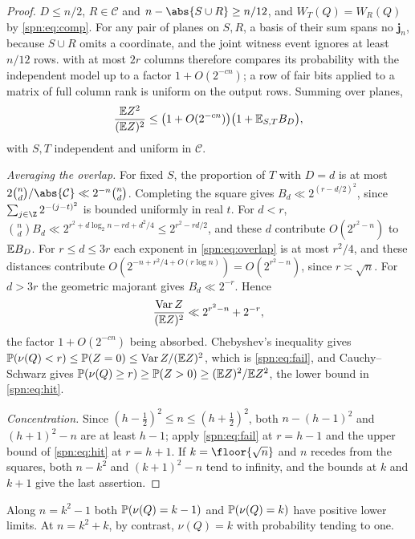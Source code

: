\begin{proof}
$D\le n/2$, $R\in\mathcal C$ and $n-\abs{S\cup R}\ge n/12$, and $W_T(Q)=W_R(Q)$ by
\eqref{spn:eq:comp}. For any pair of planes on $S,R$, a basis of their sum spans no
$\mathbf j_n$, because $S\cup R$ omits a coordinate, and the joint witness event ignores at
least $n/12$ rows.  with at most $2r$ columns therefore compares its
probability with the independent model up to a factor $1+O(2^{-cn})$; a row of fair bits
applied to a matrix of full column rank is uniform on the output rows. Summing over planes,
\[
 \frac{\mathbb{E} Z^2}{(\mathbb{E} Z)^2}\le\bigl(1+O(2^{-cn})\bigr)\bigl(1+\mathbb{E}_{S,T}B_D\bigr),
\]
with $S,T$ independent and uniform in $\mathcal C$.

\emph{Averaging the overlap.} For fixed $S$, the proportion of $T$ with $D=d$ is at most
$2\binom nd/\abs{\mathcal C}\ll2^{-n}\binom nd$. Completing the square gives
$B_d\ll2^{(r-d/2)^2}$, since $\sum_{j\in\Z}2^{-(j-t)^2}$ is bounded uniformly in real $t$.
For $d<r$, $\binom ndB_d\ll2^{r^2+d\log_2n-rd+d^2/4}\le2^{r^2-rd/2}$, and these $d$ contribute
$O(2^{r^2-n})$ to $\mathbb{E} B_D$. For $r\le d\le3r$ each exponent in \eqref{spn:eq:overlap} is at
most $r^2/4$, and these distances contribute $O(2^{-n+r^2/4+O(r\log n)})=O(2^{r^2-n})$, since
$r\asymp\sqrt n$. For $d>3r$ the geometric majorant gives $B_d\ll2^{-r}$. Hence
\begin{equation}\label{spn:eq:variance}
 \frac{\operatorname{Var}Z}{(\mathbb{E} Z)^2}\ll2^{r^2-n}+2^{-r},
\end{equation}
the factor $1+O(2^{-cn})$ being absorbed. Chebyshev's inequality gives
$\mathbb{P}(\nu(Q)<r)\le\mathbb{P}(Z=0)\le\operatorname{Var}Z/(\mathbb{E} Z)^2$, which is \eqref{spn:eq:fail},
and Cauchy--Schwarz gives $\mathbb{P}(\nu(Q)\ge r)\ge\mathbb{P}(Z>0)\ge(\mathbb{E} Z)^2/\mathbb{E} Z^2$, the lower
bound in \eqref{spn:eq:hit}.

\emph{Concentration.} Since $(h-\tfrac12)^2\le n\le(h+\tfrac12)^2$, both $n-(h-1)^2$ and
$(h+1)^2-n$ are at least $h-1$; apply \eqref{spn:eq:fail} at $r=h-1$ and the upper bound of
\eqref{spn:eq:hit} at $r=h+1$. If $k=\floor{\sqrt n}$ and $n$ recedes from the squares, both
$n-k^2$ and $(k+1)^2-n$ tend to infinity, and the bounds at $k$ and $k+1$ give the last
assertion.
\end{proof}

\begin{corollary}\label{spn:cor:twovalues}
Along $n=k^2-1$ both $\mathbb{P}(\nu(Q)=k-1)$ and $\mathbb{P}(\nu(Q)=k)$ have positive lower limits. At
$n=k^2+k$, by contrast, $\nu(Q)=k$ with probability tending to one.
\end{corollary}

